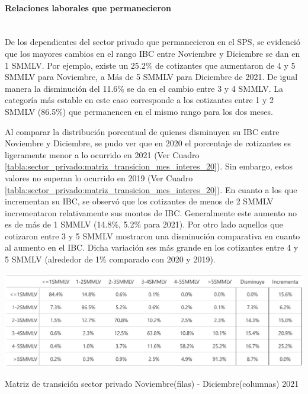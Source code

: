 \FloatBarrier
\paragraph{Relaciones laborales que permanecieron}\mbox{}\\

De los dependientes del sector privado que permanecieron en el SPS, se evidenció que los mayores cambios en el rango IBC entre Noviembre  y Diciembre se dan en 1 SMMLV. Por ejemplo, existe un 25.2\% de cotizantes que aumentaron de 4 y 5 SMMLV para Noviembre, a Más de 5 SMMLV para Diciembre de 2021. De igual manera la disminución del 11.6\% se da en el cambio entre 3 y 4 SMMLV. La categoría más estable en este caso corresponde a los cotizantes entre 1 y 2 SMMLV (86.5\%) que permanencen en el mismo rango para los dos meses. 

Al comparar la distribución porcentual de quienes disminuyen su IBC entre Noviembre y Diciembre, se pudo ver que en 2020 el porcentaje de cotizantes es ligeramente menor a lo ocurrido en 2021 (Ver Cuadro \ref{tabla:sector_privado:matriz_transicion_mes_interes_20}). Sin embargo, estos valores no superan lo ocurrido en 2019 (Ver Cuadro \ref{tabla:sector_privado:matriz_transicion_mes_interes_20}). En cuanto a los que incrementan su IBC, se observó que los cotizantes de menos de 2 SMMLV incrementaron relativamente sus montos de IBC. Generalmente este aumento no es de más de 1 SMMLV (14.8\%, 5.2\% para 2021). Por otro lado aquellos que cotizaron entre 3 y 5 SMMLV mostraron una disminución comparativa en cuanto al aumento en el IBC. Dicha variación ses más grande en los cotizantes entre 4 y 5 SMMLV (alrededor de 1\% comparado con 2020 y 2019). 

\begin{table}[!htbp]
\label{tabla:sector_privado:matriz_transicion_mes_interes_21}
\centering
\includegraphics[width = 15cm]{results/02_longitudinal/salida_matriz_transicion_dependientes_21.png}
\caption{Matriz de transición sector privado Noviembre(filas) - Diciembre(columnas) 2021}%
\label{tabla:dependientes:matriz_transicion}
\end{table}

